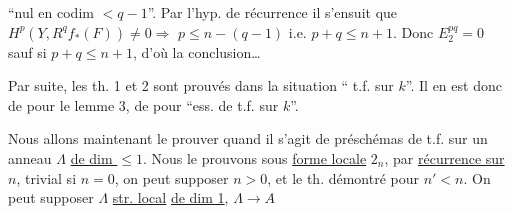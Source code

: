 ``nul en codim $<q-1$''. Par l'hyp. de récurrence
il s'ensuit que $H^p(Y,R^qf_*(F))\ne0\Rightarrow$
$p\leq n-(q-1)$  i.e. $p+q\leq n+1$. Donc $E_2^{pq}=0$
sauf si $p+q\leq n+1$, d'où la conclusion\ldots

Par suite, les th. 1 et 2 sont prouvés
dans la situation 
`` t.f. sur $k$''. Il en est
donc de \unsure{$=$} pour le lemme 3, de \unsure{$=$}
pour ``ess. de t.f. sur $k$''.

Nous allons maintenant le prouver
 quand il s'agit de préschémas
 de t.f. sur un
anneau  $\Lambda$ \uline{de dim $\leq1$}. Nous le
prouvons sous \uline{ forme locale} $2_n$,
par \uline{récurrence sur} $n$, trivial si $n=0$,
on peut supposer $n>0$, et le th. démontré
pour $n'<n$. On peut supposer $\Lambda$ \uline{str. local}
 \uline{de dim 1}, $\Lambda\to A$    
